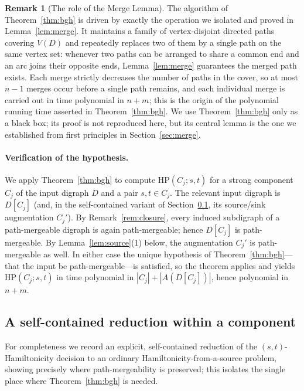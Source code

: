 \documentclass[12pt]{article}
\theoremstyle{definition}
\newtheorem{remark}{Remark}
\begin{document}
\begin{remark}[The role of the Merge Lemma]\label{rem:engine}
The algorithm of Theorem~\ref{thm:bgh} is driven by exactly the operation we
isolated and proved in Lemma~\ref{lem:merge}. It maintains a family of
vertex-disjoint directed paths covering $V(D)$ and repeatedly replaces two of them
by a single path on the same vertex set: whenever two paths can be arranged to
share a common end and an arc joins their opposite ends, Lemma~\ref{lem:merge}
guarantees the merged path exists. Each merge strictly decreases the number of
paths in the cover, so at most $n-1$ merges occur before a single path remains, and
each individual merge is carried out in time polynomial in $n+m$; this is the
origin of the polynomial running time asserted in Theorem~\ref{thm:bgh}. We use
Theorem~\ref{thm:bgh} only as a black box; its proof is not reproduced here, but
its central lemma is the one we established from first principles in
Section~\ref{sec:merge}.
\end{remark}

\paragraph{Verification of the hypothesis.}
We apply Theorem~\ref{thm:bgh} to compute $\mathrm{HP}(C_{j};s,t)$ for a strong
component $C_{j}$ of the input digraph $D$ and a pair $s,t\in C_{j}$. The relevant
input digraph is $D[C_{j}]$ (and, in the self-contained variant of
Section~\ref{sec:selfcontained}, its source/sink augmentation $C_{j}'$). By
Remark~\ref{rem:closure}, every induced subdigraph of a path-mergeable digraph is
again path-mergeable; hence $D[C_{j}]$ is path-mergeable. By
Lemma~\ref{lem:source}(1) below, the augmentation $C_{j}'$ is path-mergeable as
well. In either case the unique hypothesis of Theorem~\ref{thm:bgh}---that the
input be path-mergeable---is satisfied, so the theorem applies and yields
$\mathrm{HP}(C_{j};s,t)$ in time polynomial in $|C_{j}|+|A(D[C_{j}])|$, hence
polynomial in $n+m$.

\subsection{A self-contained reduction within a component}\label{sec:selfcontained}

For completeness we record an explicit, self-contained reduction of the
$(s,t)$-Hamiltonicity decision to an ordinary Hamiltonicity-from-a-source problem,
showing precisely where path-mergeability is preserved; this isolates the single
place where Theorem~\ref{thm:bgh} is needed.
\end{document}
